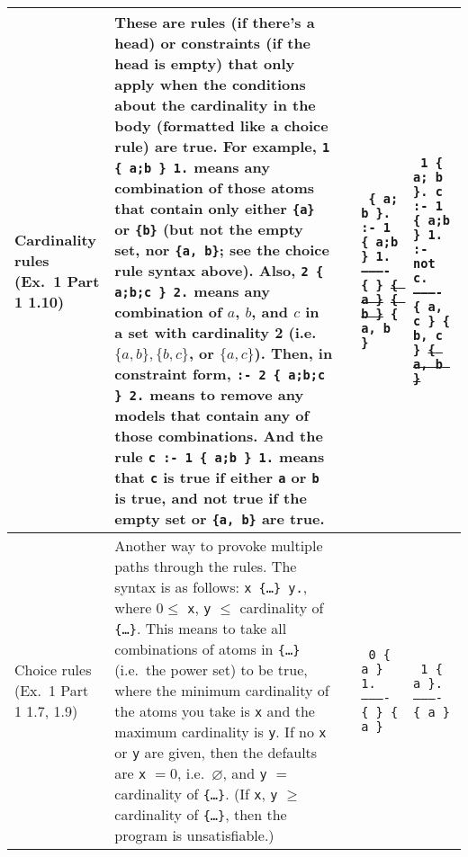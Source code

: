 \documentclass[9pt,a4paper,landscape]{article}
\begin{document}
{\begin{longtable}{Lp{14.5cm}lXX}
Cardinality rules \newline (Ex.\ 1 Part 1  1.10)
& These are rules (if there's a head) or constraints (if the head is empty) that only apply when the conditions about the cardinality in the body (formatted like a choice rule) are true.
For example, \texttt{1 \{ a;b \} 1.} means any combination of those atoms that contain only either \texttt{\{a\}} or \texttt{\{b\}} (but not the empty set, nor \texttt{\{a, b\}}; see the choice rule syntax above).
Also, \texttt{2 \{ a;b;c \} 2.} means any combination of $a$, $b$, and $c$ in a set with cardinality 2 (i.e.\ $\{a,b\}, \{b, c\}$, or $\{a, c\}$).
Then, in constraint form, \texttt{:- 2 \{ a;b;c \} 2.} means to remove any models that contain any of those combinations.
And the rule \texttt{c :- 1 \{ a;b \} 1.} means that \texttt{c} is true if either \texttt{a} or \texttt{b} is true, and not true if the empty set or \texttt{\{a, b\}} are true.
&& \texttt{%
	\{ a; b \}. \newline
	:- 1 \{ a;b \} 1. \newline
	---------- \newline
	\{ \} \newline
	\sout{\{ a \}} \newline
	\sout{\{ b \}} \newline			
	\{ a, b \}}
& \texttt{%
	1 \{ a; b \}. \newline
	c :- 1 \{ a;b \} 1. \newline
	:- not c. \newline
	---------- \newline
	\{ a, c \} \newline
	\{ b, c \} \newline
	\sout{\{ a, b \}} } \\ \midrule		


Choice rules \newline (Ex.\ 1 Part 1  1.7, 1.9)
& Another way to provoke multiple paths through the rules.
The syntax is as follows: \newline \texttt{x \{\ldots \} y.}, where $0 \leq$ \texttt{x}, \texttt{y} $\leq$ cardinality of \texttt{\{\ldots \}}. 
This means to take all combinations of atoms in \texttt{\{\ldots \}} (i.e.\ the power set) to be true, where the minimum cardinality of the atoms you take is \texttt{x} and the maximum cardinality is \texttt{y}. 
If no \texttt{x} or \texttt{y} are given, then the defaults are \texttt{x} $ = 0$, i.e.\ $\varnothing$, and \texttt{y} $=$ cardinality of \texttt{\{\ldots \}}.
(If \texttt{x}, \texttt{y} $\geq$ cardinality of \texttt{\{\ldots \}}, then the program is unsatisfiable.)
&& \texttt{%
	0 \{ a \} 1. \newline
	---------- \newline
	\{ \} \newline
	\{ a \} }
& \texttt{%
	1 \{ a \}. \newline
	---------- \newline
	\{ a \} }\\


\end{longtable}}
\end{document}
